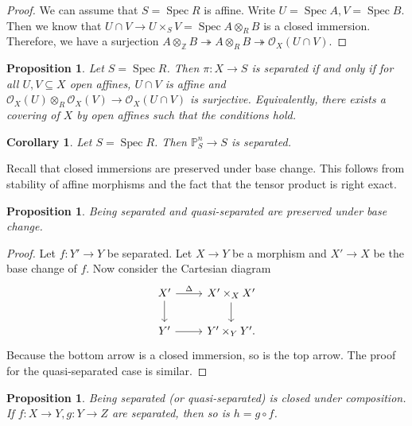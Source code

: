 \documentclass[leqno, openany]{memoir}
\newtheorem{cor}[thm]{Corollary}
\newtheorem{prop}[thm]{Proposition}
\theoremstyle{definition}
\theoremstyle{remark}
\theoremstyle{plain}
\theoremstyle{definition}
\theoremstyle{remark}
\newcommand{\Z}{\mathbb{Z}}
\renewcommand{\P}{\mathbb{P}}
\newcommand{\mc}[1]{\mathcal{#1}}
\DeclareMathOperator{\Spec}{Spec}
\begin{document}
\begin{proof} We can assume that $S = \Spec R$ is affine. Write $U = \Spec A, V
    = \Spec B$. Then we know that $U \cap V \to U \times_S V = \Spec A
    \otimes_R B$ is a closed immersion. Therefore, we have a surjection $A
    \otimes_{\Z} B \twoheadrightarrow A \otimes_R B \twoheadrightarrow
    \mc{O}_X(U \cap V)$.  \end{proof}

\begin{prop} Let $S = \Spec R$. Then $\pi \colon X \to S$ is separated if and
    only if for all $U, V \subseteq X$ open affines, $U \cap V$ is affine and
    $\mc{O}_X(U) \otimes_R \mc{O}_X(V) \to \mc{O}_X(U \cap V)$ is surjective.
    Equivalently, there exists a covering of $X$ by open affines such that the
    conditions hold.  \end{prop}

\begin{cor} Let $S = \Spec R$. Then $\P^n_S \to S$ is separated.  \end{cor}

Recall that closed immersions are preserved under base change. This follows
from stability of affine morphisms and the fact that the tensor product is
right exact. 

\begin{prop} Being separated and quasi-separated are preserved under base
change.  \end{prop}

\begin{proof} Let $f \colon Y' \to Y$ be separated. Let $X \to Y$ be a morphism
    and $X' \to X$ be the base change of $f$. Now consider the Cartesian
    diagram \begin{equation*} \begin{tikzcd} X' \ar{r}{\Delta} \ar{d} & X'
        \times_X X' \ar{d} \\ Y' \ar{r} & Y' \times_Y Y'.  \end{tikzcd}
    \end{equation*} Because the bottom arrow is a closed immersion, so is the
top arrow. The proof for the quasi-separated case is similar.  \end{proof}

\begin{prop} Being separated (or quasi-separated) is closed under composition.
If $f \colon X \to Y, g \colon Y \to Z$ are separated, then so is $h = g \circ
f$.  \end{prop}
\end{document}
